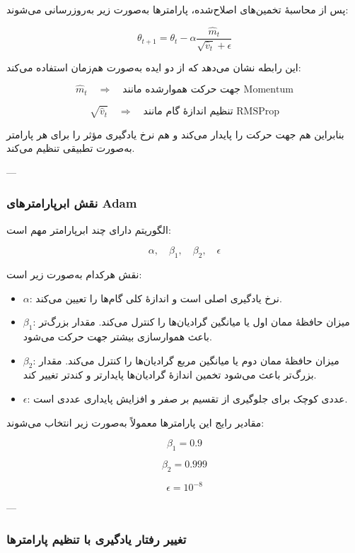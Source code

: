 \documentclass[12pt,a4paper]{article}
\begin{document}
پس از محاسبهٔ تخمین‌های اصلاح‌شده، پارامترها به‌صورت زیر به‌روزرسانی می‌شوند:

\[
\theta_{t+1}
=
\theta_t
-
\alpha
\frac{\hat{m}_t}{\sqrt{\hat{v}_t}+\epsilon}
\]

این رابطه نشان می‌دهد که  از دو ایده به‌صورت هم‌زمان استفاده می‌کند:

\[
\hat{m}_t
\quad \Longrightarrow \quad
\text{جهت حرکت هموارشده مانند Momentum}
\]

\[
\sqrt{\hat{v}_t}
\quad \Longrightarrow \quad
\text{تنظیم اندازهٔ گام مانند RMSProp}
\]

بنابراین  هم جهت حرکت را پایدار می‌کند و هم نرخ یادگیری مؤثر را برای هر پارامتر به‌صورت تطبیقی تنظیم می‌کند.

---

\subsubsection{نقش ابرپارامترهای Adam}

الگوریتم  دارای چند ابرپارامتر مهم است:

\[
\alpha,\quad \beta_1,\quad \beta_2,\quad \epsilon
\]

نقش هرکدام به‌صورت زیر است:

\begin{itemize}
	\item \(\alpha\): نرخ یادگیری اصلی است و اندازهٔ کلی گام‌ها را تعیین می‌کند.
	
	\item \(\beta_1\): میزان حافظهٔ ممان اول یا میانگین گرادیان‌ها را کنترل می‌کند. مقدار بزرگ‌تر باعث هموارسازی بیشتر جهت حرکت می‌شود.
	
	\item \(\beta_2\): میزان حافظهٔ ممان دوم یا میانگین مربع گرادیان‌ها را کنترل می‌کند. مقدار بزرگ‌تر باعث می‌شود تخمین اندازهٔ گرادیان‌ها پایدارتر و کندتر تغییر کند.
	
	\item \(\epsilon\): عددی کوچک برای جلوگیری از تقسیم بر صفر و افزایش پایداری عددی است.
\end{itemize}

مقادیر رایج این پارامترها معمولاً به‌صورت زیر انتخاب می‌شوند:

\[
\beta_1 = 0.9
\]

\[
\beta_2 = 0.999
\]

\[
\epsilon = 10^{-8}
\]

---

\subsubsection{تغییر رفتار یادگیری با تنظیم پارامترها}
\end{document}
